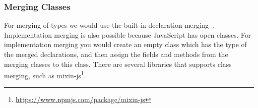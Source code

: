 \subsubsection{Merging Classes}

For merging of types we would use the built-in declaration merging~\cite{declerationmerging}.
Implementation merging is also possible because JavaScript has open classes.
For implementation merging you would create an empty class which has the type of the merged declarations, and then assign the fields and methods from the merging classes to this class.
There are several libraries that supports class merging, such as mixin-js\footnote{\url{https://www.npmjs.com/package/mixin-js}}.


